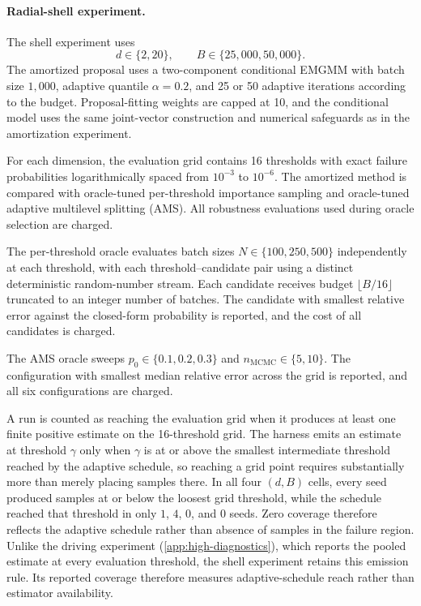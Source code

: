\paragraph{Radial-shell experiment.}
The shell experiment uses
\[
    d\in\{2,20\},
    \qquad
    B\in\{25{,}000,50{,}000\}.
\]
The amortized proposal uses a two-component conditional EMGMM with batch size $1{,}000$, adaptive quantile $\alpha=0.2$, and 25 or 50 adaptive iterations according to the budget. Proposal-fitting weights are capped at 10, and the conditional model uses the same joint-vector construction and numerical safeguards as in the amortization experiment.

For each dimension, the evaluation grid contains 16 thresholds with exact failure probabilities logarithmically spaced from $10^{-3}$ to $10^{-6}$. The amortized method is compared with oracle-tuned per-threshold importance sampling and oracle-tuned adaptive multilevel splitting (AMS). All robustness evaluations used during oracle selection are charged.

The per-threshold oracle evaluates batch sizes $N\in\{100,250,500\}$ independently at each threshold, with each threshold--candidate pair using a distinct deterministic random-number stream. Each candidate receives budget $\lfloor B/16\rfloor$ truncated to an integer number of batches. The candidate with smallest relative error against the closed-form probability is reported, and the cost of all candidates is charged.

The AMS oracle sweeps $p_0\in\{0.1,0.2,0.3\}$ and $n_{\mathrm{MCMC}}\in\{5,10\}$. The configuration with smallest median relative error across the grid is reported, and all six configurations are charged.

A run is counted as reaching the evaluation grid when it produces at least one finite positive estimate on the 16-threshold grid. The harness emits an estimate at threshold $\gamma$ only when $\gamma$ is at or above the smallest intermediate threshold reached by the adaptive schedule, so reaching a grid point requires substantially more than merely placing samples there. In all four $(d,B)$ cells, every seed produced samples at or below the loosest grid threshold, while the schedule reached that threshold in only $1$, $4$, $0$, and $0$ seeds. Zero coverage therefore reflects the adaptive schedule rather than absence of samples in the failure region. Unlike the driving experiment (\cref{app:high-diagnostics}), which reports the pooled estimate at every evaluation threshold, the shell experiment retains this emission rule. Its reported coverage therefore measures adaptive-schedule reach rather than estimator availability.

